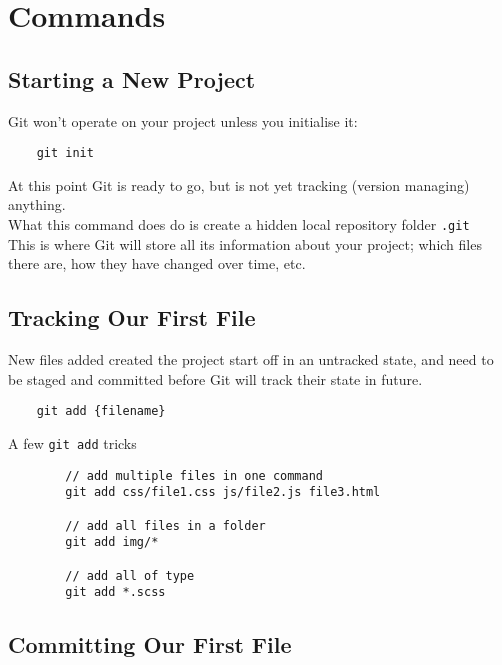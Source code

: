 \section{Commands}

\subsection{Starting a New Project}

Git won't operate on your project unless you initialise it:

\begin{verbatim}
    git init
\end{verbatim}

At this point Git is ready to go, but is not yet tracking (version managing) anything.
\\

What this command does do is create a hidden local repository folder \texttt{.git}
\\

This is where Git will store all its information about your project; which files there are, how they have changed over time, etc.

\subsection{Tracking Our First File}

New files added created the project start off in an untracked state, and need to be staged and committed before Git will track their state in future.
\\

\begin{verbatim}
    git add {filename}
\end{verbatim}

\begin{infobox}{A few \texttt{git add} tricks}
    \begin{verbatim}
        // add multiple files in one command
        git add css/file1.css js/file2.js file3.html

        // add all files in a folder
        git add img/*

        // add all of type
        git add *.scss
    \end{verbatim}
\end{infobox}

\subsection{Committing Our First File}

